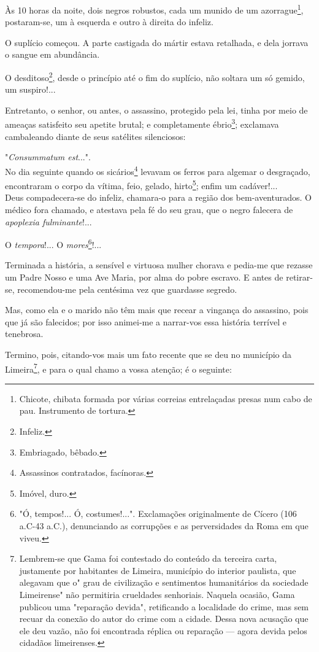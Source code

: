 Às 10 horas da noite, dois negros robustos, cada um munido de um
azorrague\footnote{Chicote, chibata formada por várias correias
  entrelaçadas presas num cabo de pau. Instrumento de tortura.},
postaram-se, um à esquerda e outro à direita do infeliz.

O suplício começou. A parte castigada do mártir estava retalhada, e dela
jorrava o sangue em abundância.

O desditoso\footnote{Infeliz.}, desde o princípio até o fim do
suplício, não soltara um só gemido, um suspiro!...

Entretanto, o senhor, ou antes, o assassino, protegido pela lei, tinha
por meio de ameaças satisfeito seu apetite brutal; e completamente
ébrio\footnote{Embriagado, bêbado.}; exclamava cambaleando diante de
seus satélites silenciosos:

"\emph{Consummatum est}...".\\
No dia seguinte quando os sicários\footnote{Assassinos contratados,
  facínoras.} levavam os ferros para algemar o desgraçado, encontraram o
corpo da vítima, feio, gelado, hirto\footnote{Imóvel, duro.}; enfim um
cadáver!...\\
Deus compadecera-se do infeliz, chamara-o para a região dos
bem-aventurados. O médico fora chamado, e atestava pela fé do seu grau,
que o negro falecera de \emph{apoplexia fulminante}!...

O \emph{tempora}!... O \emph{mores}\footnote{"Ó, tempos!... Ó,
  costumes!...". Exclamações originalmente de Cícero (106 a.C-43 a.C.),
  denunciando as corrupções e as perversidades da Roma em que viveu.}!...

Terminada a história, a sensível e virtuosa mulher chorava e pedia-me
que rezasse um Padre Nosso e uma Ave Maria, por alma do pobre escravo. E
antes de retirar-se, recomendou-me pela centésima vez que guardasse
segredo.

Mas, como ela e o marido não têm mais que recear a vingança do
assassino, pois que já são falecidos; por isso animei-me a narrar-vos
essa história terrível e tenebrosa.

Termino, pois, citando-vos mais um fato recente que se deu no município
da Limeira\footnote{Lembrem-se que Gama foi contestado do conteúdo da
  terceira carta, justamente por habitantes de Limeira, município do
  interior paulista, que alegavam que o" grau de civilização e
  sentimentos humanitários da sociedade Limeirense" não permitiria
  crueldades senhoriais. Naquela ocasião, Gama publicou uma "reparação
  devida", retificando a localidade do crime, mas sem recuar da conexão
  do autor do crime com a cidade. Dessa nova acusação que ele deu vazão,
  não foi encontrada réplica ou reparação --- agora devida pelos
  cidadãos limeirenses.}, e para o qual chamo a vossa atenção; é o
seguinte:

